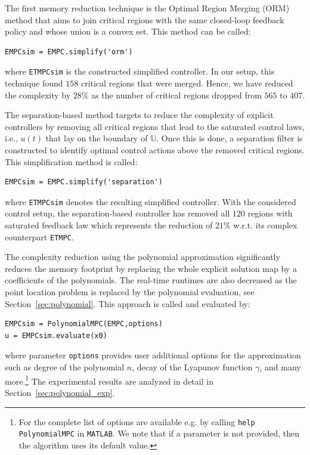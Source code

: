 \documentclass[letterpaper, 10 pt, conference]{ieeeconf}
\newcommand{\polydegree}{n}
\begin{document}
The first memory reduction technique is the Optimal Region Merging (ORM) method that aims to join critical regions with the same closed-loop feedback policy and whose union is a convex set. This method can be called: 
\begin{lstlisting}[style=Matlab-editor]
EMPCsim = EMPC.simplify('orm')
\end{lstlisting}
where \verb|ETMPCsim| is the constructed simplified controller. In our setup, this technique found $158$ critical regions that were merged. Hence, we have reduced the complexity by $28\%$ as the number of critical regions dropped from $565$ to $407$. 

%
%
The separation-based method targets to reduce the complexity of explicit controllers by removing all critical regions that lead to the saturated control laws, i.e., $u(t)$ that lay on the boundary of $\mathbb{U}$. Once this is done, a separation filter is constructed to identify optimal control actions above the removed critical regions. This simplification method is called:
\begin{lstlisting}[style=Matlab-editor]
EMPCsim = EMPC.simplify('separation')
\end{lstlisting}
where \verb|ETMPCsim| denotes the resulting simplified controller. With the considered control setup, the separation-based controller has removed all $120$ regions with saturated feedback law which represents the reduction of $21\%$ w.r.t. its complex counterpart \verb|ETMPC|.

The complexity reduction using the polynomial approximation significantly reduces the memory footprint by replacing the whole explicit solution map by a coefficients of the polynomials. The real-time runtimes are also decreased as the point location problem is replaced by the polynomial evaluation, see Section~\ref{sec:polynomial}. This approach is called and evaluated by:
\begin{lstlisting}[style=Matlab-editor]
EMPCsim = PolynomialMPC(EMPC,options)
u = EMPCsim.evaluate(x0)
\end{lstlisting}
where parameter \verb|options| provides user additional options for the approximation such as degree of the polynomial $\polydegree$, decay of the Lyapunov function $\gamma$, and many more.\footnote{For the complete list of options are available e.g. by calling \texttt{help PolynomialMPC} in \texttt{MATLAB}. We note that if a parameter is not provided, then the algorithm uses its default value.}
The experimental results are analyzed in detail in Section~\ref{sec:polynomial_exp}.
\end{document}
